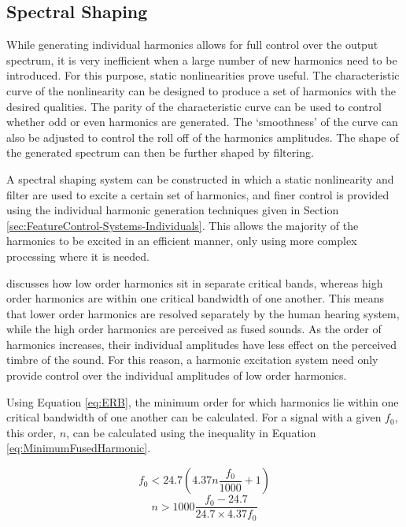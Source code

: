 	\subsection{Spectral Shaping}
	\label{sec:FeatureControl-Systems-SpectralShaping}
		While generating individual harmonics allows for full control over the output spectrum, it is very
		inefficient when a large number of new harmonics need to be introduced. For this purpose, static
		nonlinearities prove useful. The characteristic curve of the nonlinearity can be designed to produce a set
		of harmonics with the desired qualities. The parity of the characteristic curve can be used to control
		whether odd or even harmonics are generated. The `smoothness' of the curve can also be adjusted to control
		the roll off of the harmonics amplitudes. The shape of the generated spectrum can then be further shaped by
		filtering.

		A spectral shaping system can be constructed in which a static nonlinearity and filter are used to excite a
		certain set of harmonics, and finer control is provided using the individual harmonic generation techniques
		given in Section \ref{sec:FeatureControl-Systems-Individuals}. This allows the majority of the harmonics to
		be excited in an efficient manner, only using more complex processing where it is needed.

		\citet{howard2009acoustics} discusses how low order harmonics sit in separate critical bands, whereas high
		order harmonics are within one critical bandwidth of one another. This means that lower order harmonics are
		resolved separately by the human hearing system, while the high order harmonics are perceived as fused
		sounds. As the order of harmonics increases, their individual amplitudes have less effect on the perceived
		timbre of the sound. For this reason, a harmonic excitation system need only provide control over the
		individual amplitudes of low order harmonics. 

		Using Equation \ref{eq:ERB}, the minimum order for which harmonics lie within one critical bandwidth of one
		another can be calculated. For a signal with a given $f_{0}$, this order, $n$, can be calculated using the
		inequality in Equation \ref{eq:MinimumFusedHarmonic}.

		\[ f_{0} < 24.7 \left( 4.37n \frac{f_{0}}{1000} + 1 \right) \]
		\begin{equation}
			n > 1000 \frac{f_{0} - 24.7}{24.7 \times 4.37f_{0}}
			\label{eq:MinimumFusedHarmonic}
		\end{equation}

